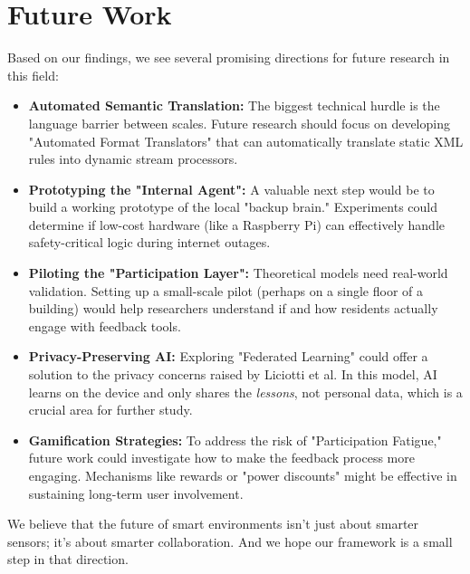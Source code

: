 \documentclass[a4paper,oneside,12pt]{report}
\begin{document}
\section{Future Work}
Based on our findings, we see several promising directions for future research in this field:
\begin{itemize}
    \item \textbf{Automated Semantic Translation:} The biggest technical hurdle is the language barrier between scales. Future research should focus on developing "Automated Format Translators" that can automatically translate static XML rules into dynamic stream processors.
    \item \textbf{Prototyping the "Internal Agent":} A valuable next step would be to build a working prototype of the local "backup brain." Experiments could determine if low-cost hardware (like a Raspberry Pi) can effectively handle safety-critical logic during internet outages.
    \item \textbf{Piloting the "Participation Layer":} Theoretical models need real-world validation. Setting up a small-scale pilot (perhaps on a single floor of a building) would help researchers understand if and how residents actually engage with feedback tools.
    \item \textbf{Privacy-Preserving AI:} Exploring "Federated Learning" could offer a solution to the privacy concerns raised by Liciotti et al. In this model, AI learns on the device and only shares the \textit{lessons}, not personal data, which is a crucial area for further study.
    \item \textbf{Gamification Strategies:} To address the risk of "Participation Fatigue," future work could investigate how to make the feedback process more engaging. Mechanisms like rewards or "power discounts" might be effective in sustaining long-term user involvement.
\end{itemize}

We believe that the future of smart environments isn't just about smarter sensors; it's about smarter collaboration. And we hope our framework is a small step in that direction.

\end{document}
